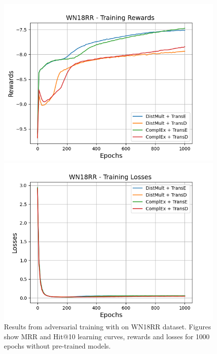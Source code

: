 \begin{figure}
    \begin{minipage}{.5\textwidth}
      \centering
      \includegraphics[width=\linewidth]{figures/results/gan_train/not_pretrained/random/wn18rr/epochs1000/random_wn18rr_rew.png}
    \end{minipage}%
     \begin{minipage}{.5\textwidth}
      \centering
      \includegraphics[width=\linewidth]{figures/results/gan_train/not_pretrained/random/wn18rr/epochs1000/random_wn18rr_losses.png}
    \end{minipage}%
    \caption{Results from adversarial training with \origsampling on \textsc{WN18RR} dataset.
    Figures show MRR and Hit@10 learning curves, rewards and losses for 1000 epochs without pre-trained models.}
    \label{fig:gan_train_not_pretrained_random_wn18rr}
\end{figure}
